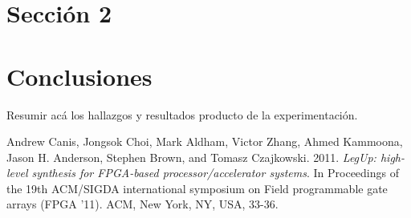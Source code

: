 \documentclass[12pt,letterpaper]{article}
\begin{document}
\section{Sección 2}


\section{Conclusiones}
Resumir acá los hallazgos y resultados producto de la experimentación.


\begin{thebibliography}{99}

Andrew Canis, Jongsok Choi, Mark Aldham, Victor Zhang, Ahmed Kammoona, Jason H. 
Anderson, Stephen Brown, and Tomasz Czajkowski. 2011. \textit{LegUp: high-level 
synthesis for FPGA-based processor/accelerator systems}. In Proceedings of the 
19th ACM/SIGDA international symposium on Field programmable gate arrays (FPGA 
'11). ACM, New York, NY, USA, 33-36. 

\end{thebibliography}
\end{document}

